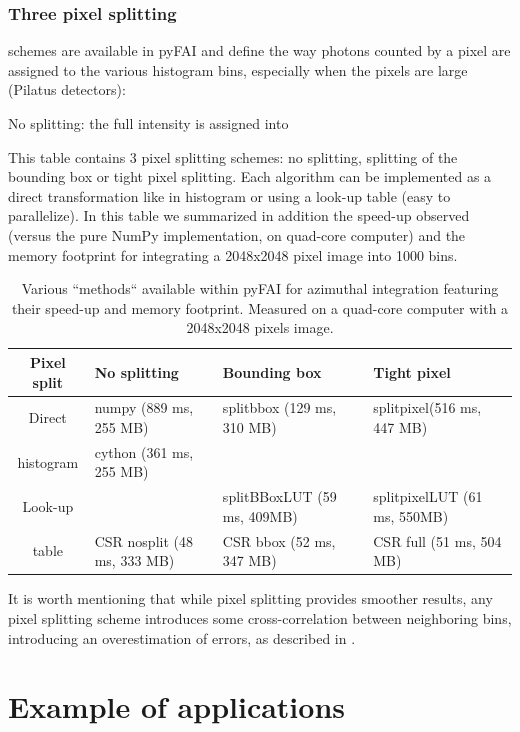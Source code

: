 \documentclass[preprint]{iucr}
\begin{document}
\subsubsection{Three pixel splitting} schemes are available in pyFAI and define
the way photons counted by a pixel are assigned to the various histogram bins,
especially when the pixels are large (Pilatus detectors):
\begin{temize}
\item No splitting: the full intensity is assigned into  
\end{temize}
This table contains 3 pixel splitting schemes: no splitting, splitting of the
bounding box or tight pixel splitting. Each algorithm can be implemented as a
direct transformation like in histogram or using a look-up table (easy to
parallelize).
In this table we summarized in addition the speed-up observed (versus the pure
NumPy \cite{numpy} implementation, on  quad-core computer) and the memory
footprint for integrating a 2048x2048 pixel image into 1000 bins.

\begin{table}
\caption{Various ``methods`` available within pyFAI for azimuthal integration
featuring their speed-up and memory footprint. Measured on a quad-core
computer with a 2048x2048 pixels image.}
\begin{tabular}[pos]{|c|l|l|l|}
\hline
Pixel split& No splitting & Bounding box & Tight pixel \\
\hline
Direct    & numpy (889 ms, 255 MB) & splitbbox (129 ms, 310 MB) &
splitpixel(516 ms, 447 MB)\\
histogram & cython (361 ms, 255 MB) &                       &                \\
\hline
Look-up   &       & splitBBoxLUT (59 ms, 409MB) & splitpixelLUT (61 ms, 550MB)\\
table     & CSR nosplit (48 ms, 333 MB)       & CSR bbox (52 ms, 347
MB) & CSR full (51 ms, 504 MB)\\
\hline
\end{tabular}
\label{table:methods}
\end{table}

It is worth mentioning that while pixel splitting provides smoother results, any
pixel splitting scheme introduces some cross-correlation between neighboring
bins, introducing an overestimation of errors, as described in \cite{billinge2014}.

\section{Example of applications}
\end{document}
